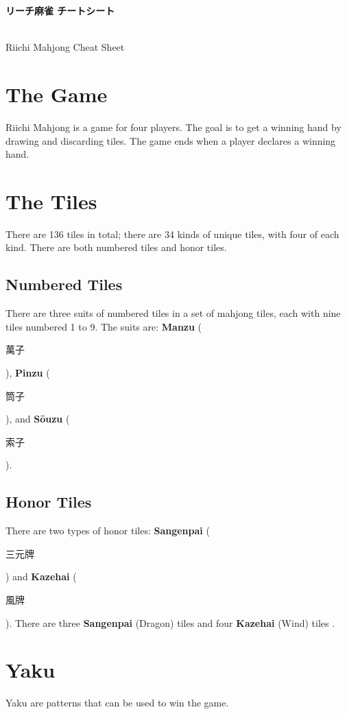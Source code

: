 \documentclass[12pt,landscape]{article}
\begin{document}
\begin{minipage}[t][.8\textheight][t]{\textwidth}
\begin{multicols*}{3}

    \begin{center}
        \begin{CJK}{UTF8}{min}
            \Large\textbf{リーチ麻雀 チートシート}
        \end{CJK}\\
        \small{Riichi Mahjong Cheat Sheet}
    \end{center}

    \section{The Game}
    Riichi Mahjong is a game for four players. 
    The goal is to get a winning hand by drawing and discarding tiles.
    The game ends when a player declares a winning hand.

    \section{The Tiles}
    There are 136 tiles in total; there are 34 kinds of unique tiles, with four of each kind.
    There are both numbered tiles and honor tiles.
    
    \subsection{Numbered Tiles}
    There are three suits of numbered tiles in a set of mahjong tiles, each with nine tiles numbered 1 to 9.
    The suits are: \textbf{Manzu} (\begin{CJK}{UTF8}{min}萬子\end{CJK}), 
    \textbf{Pinzu} (\begin{CJK}{UTF8}{min}筒子\end{CJK}), 
    and \textbf{Sōuzu} (\begin{CJK}{UTF8}{min}索子\end{CJK}).\\

    \subsection{Honor Tiles}
    There are two types of honor tiles: \textbf{Sangenpai} (\begin{CJK}{UTF8}{min}三元牌\end{CJK}) and \textbf{Kazehai} (\begin{CJK}{UTF8}{min}風牌\end{CJK}).
    There are three \textbf{Sangenpai} (Dragon) tiles  and four \textbf{Kazehai} (Wind) tiles .

    \section{Yaku}
    Yaku are patterns that can be used to win the game.

\end{multicols*}
\end{minipage}
\end{document}
